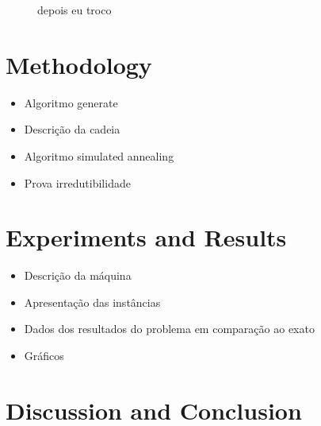 \documentclass[12pt]{article}
\begin{document}
\begin{figure}[H]
\begin{center}
      \caption{depois eu troco}
      \end{center}
    \end{figure}





\section{Methodology}

\begin{itemize}
    \item Algoritmo generate
    \item Descrição da cadeia
    \item Algoritmo simulated annealing
    \item Prova irredutibilidade
\end{itemize}

\section{Experiments and Results}

\begin{itemize}
    \item Descrição da máquina
    \item Apresentação das instâncias
    \item Dados dos resultados do problema em comparação ao exato
    \item Gráficos
\end{itemize}

\section{Discussion and Conclusion}

 

	
\end{document}
